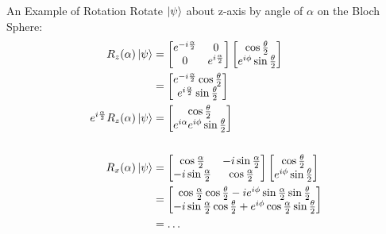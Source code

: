 \documentclass{beamer}
\begin{document}
\begin{frame}{An Example of Rotation\tiny\cite{rotationsonblochsphere}}
  {\tiny
    Rotate $\ket\psi$ about z-axis by angle of $\alpha$ on the Bloch Sphere:
  \begin{align*}
    R_z(\alpha)\ket{\psi} &= \begin{bmatrix}
                                e^{-i\frac{\alpha}2} & 0 \\
                                0                    & e^{i\frac{\alpha}2}
                              \end{bmatrix}
                              \begin{bmatrix}
                                \cos{\frac{\theta}2} \\
                                e^{i\phi}\sin{\frac{\theta}2}
                              \end{bmatrix} \\
                          &= \begin{bmatrix}
                               e^{-i\frac{\alpha}2}\cos{\frac{\theta}2} \\
                               e^{i\frac{\alpha}2}\sin{\frac{\theta}2} 
                             \end{bmatrix} \\
     e^{i\frac{\alpha}2}R_z(\alpha)\ket{\psi}
                          &= \begin{bmatrix}
                               \cos{\frac{\theta}2} \\
                               e^{i\alpha}e^{i\phi}\sin{\frac{\theta}2}
                             \end{bmatrix} \\
    \\
    R_x(\alpha)\ket{\psi} &= \begin{bmatrix}
                              \cos\frac{\alpha}2 & -i\sin\frac{\alpha}2 \\
                              -i\sin\frac{\alpha}2 & \cos\frac{\alpha}2
                             \end{bmatrix}
                             \begin{bmatrix}
                               \cos{\frac{\theta}2} \\
                               e^{i\phi}\sin{\frac{\theta}2}
                             \end{bmatrix} \\
                             &= \begin{bmatrix}
                               \cos\frac{\alpha}2 \cos\frac{\theta}2 - i e^{i\phi} \sin\frac{\alpha}2 \sin\frac{\theta}2 \\
                               -i \sin\frac{\alpha}2 \cos\frac{\theta}2 + e^{i\phi} \cos\frac{\alpha}2 \sin\frac{\theta}2
                                \end{bmatrix} \\
                             &= \dots
  \end{align*}
  }%
\end{frame}
\end{document}
